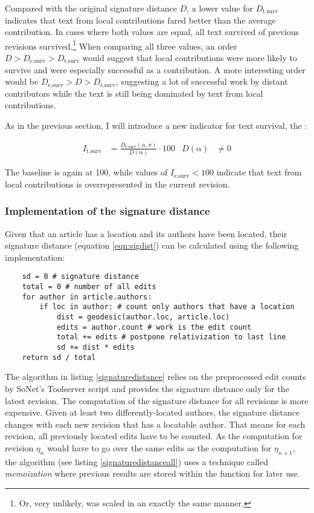Compared with the original signature distance $D$, a lower value for $D_{\text{t.surv}}$ indicates that text from local contributions fared better than the average contribution.
In cases where both values are equal, all text survived of previous revisions survived.\footnote{Or, very unlikely, was scaled in an exactly the same manner.}
When comparing all three values, an order $D > D_{\text{e.surv}} > D_{\text{t.surv}}$ would suggest that local contributions were more likely to survive and were especially successful as a contribution.
A more interesting order would be $D_{\text{e.surv}} > D > D_{\text{t.surv}}$, suggesting a lot of successful work by distant contributors while the text is still being dominated by text from local contributions.

As in the previous section, I will introduce a new indicator for text survival, the :

\begin{align}
 I_{\text{t.surv}} &= \frac{D_{\text{t.surv}}(\alpha,\pi)}{D(\alpha)} \cdot 100 & D(\alpha) &\neq 0
\end{align}

The baseline is again at 100, while values of $I_{\text{e.surv}} < 100$ indicate that text from local contributions is overrepresented in the current revision.

\subsubsection{Implementation of the signature distance}

Given that an article has a location and its authors have been located, their signature distance (equation \ref{eqn:sigdist}) can be calculated using the following implementation:

\begin{lstlisting}
	sd = 0 # signature distance
	total = 0 # number of all edits
	for author in article.authors:
		if loc in author: # count only authors that have a location
			dist = geodesic(author.loc, article.loc)
			edits = author.count # work is the edit count
			total += edits # postpone relativization to last line 
			sd += dist * edits
	return sd / total
\end{lstlisting}

The algorithm in listing \ref{signaturedistance} relies on the preprocessed edit counts by SoNet's Toolserver script and provides the signature distance only for the latest revision. 
The computation of the signature distance for all revisions is more expensive.
Given at least two differently-located authors, the signature distance changes with each new revision that has a locatable author.
That means for each revision, all previously located edits have to be counted.
As the computation for revision $\eta_{n}$ would have to go over the same edits as the computation for $\eta_{n+1}$, the algorithm (see listing \ref{signaturedistanceall}) uses a technique called \emph{memoization} where previous results are stored within the function for later use.

